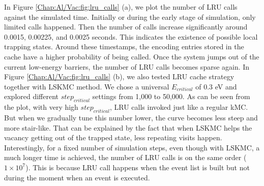 In Figure \ref{Chap:Al/Vac:fig:lru_calls} (a), we plot the number of \ac{LRU} calls against the simulated time. Initially or during the early stage of simulation, only limited calls happened. Then the number of calls increase significantly around 0.0015, 0.00225, and 0.0025 seconds. This indicates the existence of possible local trapping states. Around these timestamps, the encoding entries stored in the cache have a higher probability of being called. Once the system jumps out of the current low-energy barriers, the number of \ac{LRU} calls becomes sparse again. In Figure \ref{Chap:Al/Vac:fig:lru_calls} (b), we also tested \ac{LRU} cache strategy together with \ac{LSKMC} method. We chose a universal $E_{critical}$ of $0.3$ eV and explored different $step_{critical}$ settings from 1,000 to 50,000. As can be seen from the plot, with very high $step_{critical}$, \ac{LRU} calls invoked just like a regular \ac{kMC}. But when we gradually tune this number lower, the curve becomes less steep and more stair-like. That can be explained by the fact that when \ac{LSKMC} helps the vacancy getting out of the trapped state, less repeating visits happen. Interestingly, for a fixed number of simulation steps, even though with \ac{LSKMC}, a much longer time is achieved, the number of \ac{LRU} calls is on the same order ($1\times10^7$). This is because \ac{LRU} call happens when the event list is built but not during the moment when an event is executed.

